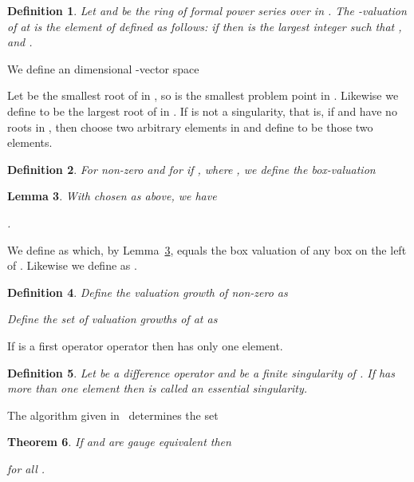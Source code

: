 \documentclass{article}
\newtheorem{theorem}{Theorem}[section]
\newtheorem{lemma}[theorem]{Lemma}
\newtheorem{definition}[theorem]{Definition}
\begin{document}
\begin{definition} Let  and  be the ring of 
formal power series over  in . The -valuation
   of  at  is the element of 
  defined as follows: if  then  is the largest integer  such that , and
  . \end{definition}



We define an  dimensional -vector space 

Let  be the smallest root of  in , so
 is the smallest problem point
in . Likewise we define  to be the largest root of  in . If  is not a singularity,
that is, if  and  have no roots in ,
then choose two arbitrary elements in  and define  to be those two elements.


\begin{definition} \label{box} For non-zero  and for  if , where , we define the {\em box-valuation}
 \end{definition}

\begin{lemma}
    \label{vl}
With  chosen as above, we have

. \end{lemma}


We define  as  which, by Lemma~\ref{vl}, equals the box valuation of any box on the left of
. Likewise we define  as .

\begin{definition}
\label{def:valg}
 Define the {\em valuation growth} of non-zero  as

Define the {\em set of valuation growths} of  at  as
 \end{definition}
If  is a first operator operator then  has only one element. 



\begin{definition}
    \label{apartsing}
    Let  be a difference operator and  be a finite singularity of . If
     has more than one element then  is called an {\em essential
      singularity}. 
\end{definition}

The algorithm given in~\cite{HO99} determines the set 
 



\begin{theorem}
    \label{gp}\cite[Theorem 1]{CH09}
If  and  are gauge equivalent then 

for all .  
\end{theorem}
\end{document}
